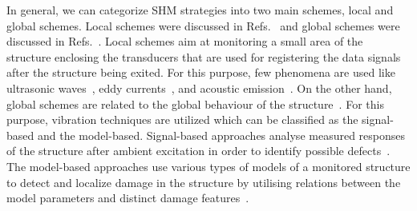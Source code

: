 In general, we can categorize SHM strategies into two main schemes, local and 
global schemes. Local schemes were discussed in Refs.~\cite{Grimberg2001,Raghavan2007}
and global schemes were discussed in Refs.~\cite{Adams2002,Doebling1998,Uhl2004}. 
Local schemes aim at monitoring a small area of the structure enclosing the transducers that are used for registering the data signals after the structure being exited. 
For this purpose, few phenomena are used like ultrasonic waves~\cite{Raghavan2007}, eddy currents~\cite{Grimberg2001}, and acoustic emission~\cite{Grosse2008}. 
On the other hand, global schemes are related to the global behaviour of the structure~\cite{Balageas2010}. 
For this purpose, vibration techniques are utilized which can be classified as the signal-based and the model-based.
Signal-based approaches analyse measured responses of the structure after 
ambient excitation in order to identify possible defects~\cite{Stepinski2013}. 
The model-based approaches use various types of models of a monitored structure 
to detect and localize damage in the structure by utilising relations 
between the model parameters and distinct damage features~\cite{Stepinski2013}. 
